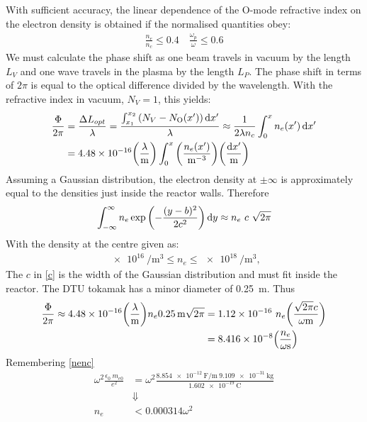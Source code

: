 With sufficient accuracy, the linear dependence of the O-mode refractive index on the electron density is obtained if the normalised quantities obey:
\begin{align}
	\frac{n_e}{n_c} \leq 0.4 \quad \frac{\omega_p}{\omega} \leq 0.6
\end{align}
We must calculate the phase shift as one beam travels in vacuum by the length \(L_V\) and one wave travels in the plasma by the length \(L_P\). The phase shift in terms of \(2 \pi\) is equal to the optical difference divided by the wavelength. With the refractive index in vacuum, \(N_V=1\), this yields:
\begin{align}
	\frac{\Phi}{2\pi} & = \frac{\Delta L_{opt}}{\lambda} = \frac{\int_{x_1}^{x_2}\pqty{N_V-N_{\mathrm{O}}(x')}\dd{x'}}{\lambda} \approx \frac{1}{2\lambda n_c}\int_{0}^{x}n_e(x')\dd{x'} \nonumber \\
	                  & = 4.48\times 10^{-16} \pqty{\frac{\lambda}{\si{\meter}}}\int_{0}^{x}\pqty{\frac{n_e(x')}{\si{\per\meter\cubed}}}\pqty{\frac{\dd{x'}}{\si{\meter}}} \label{Phipi}
\end{align}
Assuming a Gaussian distribution, the electron density at \(\pm\infty\) is approximately equal to the densities just inside the reactor walls. Therefore
\begin{align}
	\int_{-\infty}^{\infty}n_e \exp\pqty{-\frac{(y-b)^2}{2c^2}}\dd{y} \approx n_e\ c\ \sqrt{2\pi}\label{c}
\end{align}
With the density at the centre given as:
\begin{align}
	\SI{e16}{\per\meter\cubed} \leq n_e \leq \SI{e18}{\per\meter\cubed},
\end{align}
The \(c\) in \cref{c} is the width of the Gaussian distribution and must fit inside the reactor. The DTU tokamak has a minor diameter of \SI{0.25}{\meter}. Thus
\begin{align}
	\frac{\Phi}{2\pi} \approx 4.48\times 10^{-16}\pqty{\frac{\lambda}{\si{\meter}}}n_e\SI{0.25}{\meter}\sqrt{2\pi} & = 1.12\times 10^{-16}\ n_e  \pqty{\frac{\sqrt{2\pi} c}{\omega\si{\meter}}} \nonumber \\
	                                                                                                               & = 8.416\times 10^{-8}\pqty{\frac{n_e}{\omega\si{\second}}}\label{Phipi2}
\end{align}
Remembering \cref{nenc}
\begin{align}
	\omega^2\frac{\epsilon_0\ m_{e0}}{e^2} & = \omega^2\frac{\SI{8.854e-12}{\farad\per\meter}\ \SI{9.109e-31}{\kilo\gram}}{\SI{1.602e-19}{\coulomb}} \\
	                                       & \Downarrow\nonumber                                                                                     \\
	n_e                                    & < 0.000314\omega^2 \label{co}
\end{align}
